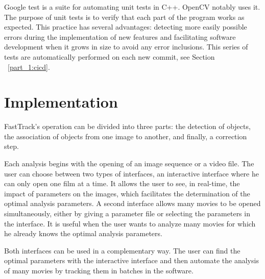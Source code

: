     Google test is a suite for automating unit tests in C++. OpenCV notably uses it. The purpose of unit tests is to verify that each part of the program works as expected. This practice has several advantages: detecting more easily possible errors during the implementation of new features and facilitating software development when it grows in size to avoid any error inclusions. This series of tests are automatically performed on each new commit, see Section ~\ref{part_1:cicd}.

    \section{Implementation}
    FastTrack's operation can be divided into three parts: the detection of objects, the association of objects from one image to another, and finally, a correction step.

    Each analysis begins with the opening of an image sequence or a video file. The user can choose between two types of interfaces, an interactive interface where he can only open one film at a time. It allows the user to see, in real-time, the impact of parameters on the images, which facilitates the determination of the optimal analysis parameters. A second interface allows many movies to be opened simultaneously, either by giving a parameter file or selecting the parameters in the interface. It is useful when the user wants to analyze many movies for which he already knows the optimal analysis parameters.

    Both interfaces can be used in a complementary way. The user can find the optimal parameters with the interactive interface and then automate the analysis of many movies by tracking them in batches in the software.

